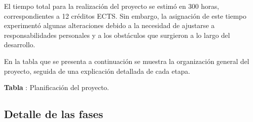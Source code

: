\vspace{0.4cm}

El tiempo total para la realización del proyecto se estimó en 300 horas, correspondientes a 12 créditos ECTS. Sin embargo, la asignación de este tiempo experimentó algunas alteraciones debido a la necesidad de ajustarse a responsabilidades personales y a los obstáculos que surgieron a lo largo del desarrollo.

\vspace{0.4cm}

En la tabla que se presenta a continuación se muestra la organización general del proyecto, seguida de una explicación detallada de cada etapa.

\vspace{0.4cm}

\begin{center}
\label{tab:planificacion-proyecto}
\renewcommand{\arraystretch}{1.25}
\par\vspace{0.3cm}
{\small \textbf{Tabla \thetable}: Planificación del proyecto.}
\end{center}

\subsection{Detalle de las fases}

